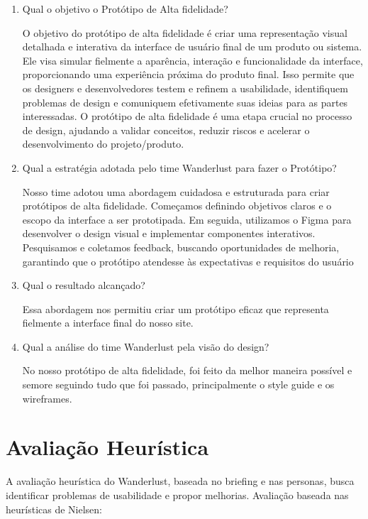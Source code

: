 \documentclass{article}
\begin{document}
\begin{enumerate}
      \item Qual o objetivo o Protótipo de Alta fidelidade?

            O objetivo do protótipo de alta fidelidade é criar uma representação visual detalhada e interativa da interface de usuário final de um produto ou sistema. Ele visa simular fielmente a aparência, interação e funcionalidade da interface, proporcionando uma experiência próxima do produto final. Isso permite que os designers e desenvolvedores testem e refinem a usabilidade, identifiquem problemas de design e comuniquem efetivamente suas ideias para as partes interessadas. O protótipo de alta fidelidade é uma etapa crucial no processo de design, ajudando a validar conceitos, reduzir riscos e acelerar o desenvolvimento do projeto/produto.

      \item Qual a estratégia adotada pelo time Wanderlust para fazer o Protótipo?

            Nosso time adotou uma abordagem cuidadosa e estruturada para criar protótipos de alta fidelidade. Começamos definindo objetivos claros e o escopo da interface a ser prototipada. Em seguida, utilizamos o Figma para desenvolver o design visual e implementar componentes interativos. Pesquisamos e coletamos feedback, buscando oportunidades de melhoria, garantindo que o protótipo atendesse às expectativas e requisitos do usuário

      \item Qual o resultado alcançado?

            Essa abordagem nos permitiu criar um protótipo eficaz que representa fielmente a interface final do nosso site.

      \item Qual a análise do time Wanderlust pela visão do design?

            No nosso protótipo de alta fidelidade, foi feito da melhor maneira possível e semore seguindo tudo que foi passado, principalmente o style guide e os wireframes.

\end{enumerate}

\section{Avaliação Heurística}

A avaliação heurística do Wanderlust, baseada no briefing e nas personas, busca identificar problemas de usabilidade e propor melhorias. Avaliação baseada nas heurísticas de Nielsen:
\end{document}
